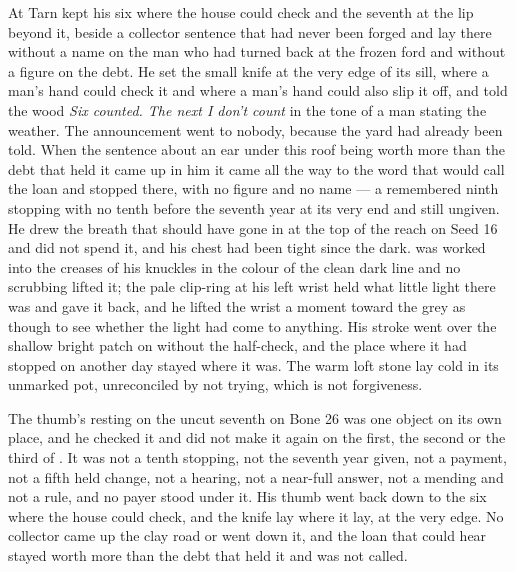 At  Tarn kept his six where the house could check and the seventh at the lip beyond it, beside a collector sentence that had never been forged and lay there without a name on the man who had turned back at the frozen ford and without a figure on the debt. He set the small knife at the very edge of its sill, where a man's hand could check it and where a man's hand could also slip it off, and told the wood \emph{Six counted. The next I don't count} in the tone of a man stating the weather. The announcement went to nobody, because the yard had already been told. When the sentence about an ear under this roof being worth more than the debt that held it came up in him it came all the way to the word that would call the loan and stopped there, with no figure and no name --- a remembered ninth stopping with no tenth before the seventh year at its very end and still ungiven. He drew the breath that should have gone in at the top of the reach on Seed 16 and did not spend it, and his chest had been tight since the dark.  was worked into the creases of his knuckles in the colour of the clean dark line and no scrubbing lifted it; the pale clip-ring at his left wrist held what little light there was and gave it back, and he lifted the wrist a moment toward the grey as though to see whether the light had come to anything. His stroke went over the shallow bright patch on  without the half-check, and the place where it had stopped on another day stayed where it was. The warm loft stone lay cold in its unmarked pot, unreconciled by not trying, which is not forgiveness.

The thumb's resting on the uncut seventh on Bone 26 was one object on its own place, and he checked it and did not make it again on the first, the second or the third of . It was not a tenth stopping, not the seventh year given, not a payment, not a fifth held change, not a hearing, not a near-full answer, not a mending and not a rule, and no payer stood under it. His thumb went back down to the six where the house could check, and the knife lay where it lay, at the very edge. No collector came up the clay road or went down it, and the loan that could hear stayed worth more than the debt that held it and was not called.

